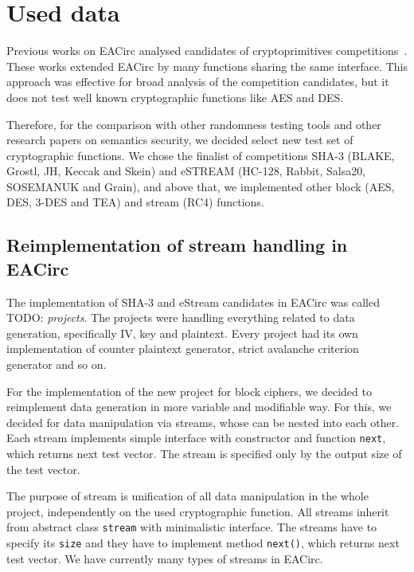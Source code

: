 \documentclass[
  print, %
  Table,   %
  nolof,     %
  nolot,     %
  11pt, %
  oneside  %
]{fithesis3}
\newcommand{\todo}[1]{TODO: \textit{#1}}
\begin{document}
\section{Used data}
\label{sec:method-data}

Previous works on EACirc analysed candidates of cryptoprimitives competitions~\cite{estreamMgrThesis,sha3Thesis,ukropMgrThesis}. These works extended EACirc by many functions sharing the same interface. This approach was effective for broad analysis of the competition candidates, but it does not test well known cryptographic functions like AES and DES.

Therefore, for the comparison with other randomness testing tools and other research papers on semantics security, we decided select new test set of cryptographic functions. We chose the finalist of competitions SHA-3 (BLAKE, Grostl, JH, Keccak and Skein) and eSTREAM (HC-128, Rabbit, Salsa20, SOSEMANUK and Grain), and above that, we implemented other block (AES, DES, 3-DES and TEA) and stream (RC4) functions.

\subsection{Reimplementation of stream handling in EACirc}
\label{subsec:method-data-streams}

The implementation of SHA-3 and eStream candidates in EACirc was called \todo{projects}. The projects were handling everything related to data generation, specifically IV, key and plaintext. Every project had its own implementation of counter plaintext generator, strict avalanche criterion generator and so on.

For the implementation of the new project for block ciphers, we decided to reimplement data generation in more variable and modifiable way. For this, we decided for data manipulation via streams, whose can be nested into each other. Each stream implements simple interface with constructor and function \texttt{next}, which returns next test vector. The stream is specified only by the output size of the test vector.

The purpose of stream is unification of all data manipulation in the whole project, independently on the used cryptographic function. All streams inherit from abstract class \texttt{stream} with minimalistic interface. The streams have to specify its \texttt{size} and they have to implement method \texttt{next()}, which returns next test vector. We have currently many types of streams in EACirc.
\end{document}
